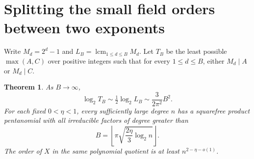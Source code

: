 \documentclass[11pt]{article}
\newtheorem{theorem}{Theorem}
\begin{document}
\section{Splitting the small field orders between two exponents}
Write \(M_d=2^d-1\) and \(L_B=\operatorname{lcm}_{1\le d\le B}M_d\).
Let \(T_B\) be the least possible \(\max(A,C)\) over positive integers
such that for every \(1\le d\le B\), either \(M_d\mid A\) or \(M_d\mid C\).
\begin{theorem}\label{thm:balanced-sieve}
As \(B\to\infty\),
\[
          \log_2 T_B\sim\tfrac12\log_2 L_B
                         \sim\frac{3}{2\pi^2}B^2 .
\]
For each fixed \(0<\eta<1\), every sufficiently large degree \(n\)
has a squarefree product pentanomial with all irreducible factors of
degree greater than
\[
       B=\left\lfloor\pi\sqrt{\frac{2\eta}{3}\log_2 n}\right\rfloor .
\]
The order of \(X\) in the same polynomial quotient is at least
\(n^{2-\eta-o(1)}\).
\end{theorem}
\end{document}
